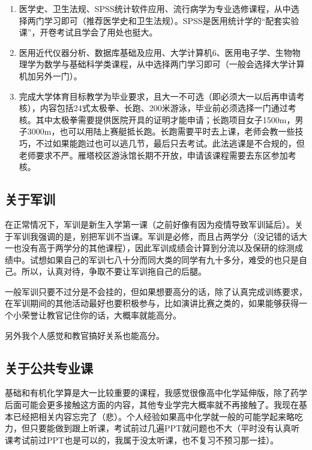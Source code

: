 \documentclass[zihao=-4,fontset=none]{Beautybook-CN}
\begin{document}
\begin{example}
   \begin{enumerate}
       \item 医学史、卫生法规、SPSS统计软件应用、流行病学为专业选修课程，从中选择两门学习即可（推荐医学史和卫生法规）。SPSS是医用统计学的“配套实验课”，开卷考试且学会了用处也挺大。

\item 医用近代仪器分析、数据库基础及应用、大学计算机6、医用电子学、生物物理学为数学与基础科学类课程，从中选择两门学习即可（一般会选择大学计算机加另外一门）。

\item 完成大学体育目标教学为毕业要求，且大一不可选（即必须大一以后再申请考核），内容包括24式太极拳、长跑、200米游泳，毕业前必须选择一门通过考核。其中太极拳需要提供医院开具的证明才能申请；长跑项目女子1500m，男子3000m，也可以用陆上赛艇抵长跑。长跑需要平时去上课，老师会教一些技巧，不过如果能跑过也可以逃几节，最后只去考试。此法逃课是不合规的，但老师要求不严。雁塔校区游泳馆长期不开放，申请该课程需要去东区参加考核。

   \end{enumerate} 
\end{example}

\subsection{关于军训}

在正常情况下，军训是新生入学第一课（之前好像有因为疫情导致军训延后）。关于军训我强调的是，别把军训不当课。军训是必修，而且占两学分（没记错的话大一也没有高于两学分的其他课程），因此军训成绩会计算到分流以及保研的综测成绩中。试想如果自己的军训七八十分而同大类的同学有九十多分，难受的也只是自己。所以，认真对待，争取不要让军训拖自己的后腿。

一般军训只要不过分是不会挂的，但如果想要高分的话，除了认真完成训练要求，在军训期间的其他活动最好也要积极参与，比如演讲比赛之类的，如果能够获得一个小荣誉让教官记住你的话，大概率就能高分。

另外我个人感觉和教官搞好关系也能高分。

\subsection{关于公共专业课}

基础和有机化学算是大一比较重要的课程，我感觉很像高中化学延伸版，除了药学后面可能会更多接触这方面的内容，其他专业学完大概率就不再接触了。我现在基本已经把相关内容忘完了（悲）。个人经验如果高中化学就一般的可能学起来略吃力，但只要能做到跟上听课，考试前过几遍PPT就问题也不大（平时没有认真听课考试前过PPT也是可以的，我属于没太听课，也不复习不预习那一挂）。
\end{document}
